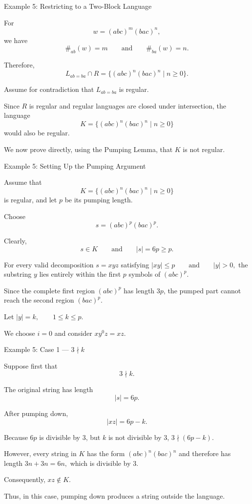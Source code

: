 \documentclass[10pt,aspectratio=169]{beamer}
\begin{document}
\begin{frame}{Example 5: Restricting to a Two-Block Language}

\small
For
\[
w=(abc)^m(bac)^n,
\]
we have
\[
\#_{ab}(w)=m
\qquad\text{and}\qquad
\#_{ba}(w)=n.
\]

Therefore,
\[
L_{ab=ba}\cap R
=
\{(abc)^n(bac)^n\mid n\geq 0\}.
\]

Assume for contradiction that \(L_{ab=ba}\) is regular.

Since \(R\) is regular and regular languages are closed under
intersection, the language
\[
K
=
\{(abc)^n(bac)^n\mid n\geq 0\}
\]
would also be regular.

We now prove directly, using the Pumping Lemma, that \(K\) is not
regular.

\end{frame}

\begin{frame}{Example 5: Setting Up the Pumping Argument}

\small
Assume that
\[
K=\{(abc)^n(bac)^n\mid n\geq 0\}
\]
is regular, and let \(p\) be its pumping length.

Choose
\[
s=(abc)^p(bac)^p.
\]

Clearly,
\[
s\in K
\qquad\text{and}\qquad
|s|=6p\geq p.
\]

For every valid decomposition
\(
s=xyz
\)
satisfying
\(
|xy|\leq p
\qquad\text{and}\qquad
|y|>0,
\)
the substring \(y\) lies entirely within the first \(p\) symbols of
\((abc)^p\).

Since the complete first region \((abc)^p\) has length \(3p\), the
pumped part cannot reach the second region \((bac)^p\).

Let
\(
|y|=k,
\qquad 1\leq k\leq p.
\)

We choose \(i=0\) and consider
\(
xy^0z=xz.
\)

\end{frame}

\begin{frame}{Example 5: Case 1 --- \(3\nmid k\)}

\small
Suppose first that
\[
3\nmid k.
\]

The original string has length
\[
|s|=6p.
\]

After pumping down,
\[
|xz|=6p-k.
\]

Because \(6p\) is divisible by \(3\), but \(k\) is not divisible by
\(3\),
\(
3\nmid(6p-k).
\)

However, every string in \(K\) has the form
\(
(abc)^n(bac)^n
\)
and therefore has length
\(
3n+3n=6n,
\)
which is divisible by \(3\).

Consequently,
\(
xz\notin K.
\)

Thus, in this case, pumping down produces a string outside the
language.

\end{frame}
\end{document}

